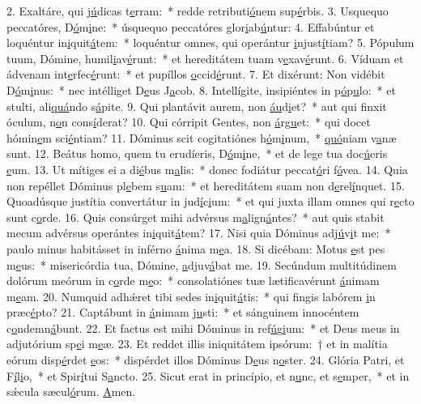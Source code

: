 2. Exaltáre, qui j\uline{ú}dicas t\uline{e}rram:~* redde retributi\uline{ó}nem sup\uline{é}rbis.
3. Usquequo peccatóres, D\uline{ó}m\uline{i}ne:~* úsquequo peccatóres glor\uline{i}ab\uline{ú}ntur:
4. Effabúntur et loquéntur in\uline{i}quit\uline{á}tem:~* loquéntur omnes, qui operántur \uline{i}njust\uline{í}tiam?
5. Pópulum tuum, Dómine, humil\uline{i}av\uline{é}runt:~* et hereditátem tuam v\uline{e}xav\uline{é}runt.
6. Víduam et ádvenam int\uline{e}rfec\uline{é}runt:~* et pupíllos \uline{o}ccid\uline{é}runt.
7. Et dixérunt: Non vidébit D\uline{ó}m\uline{i}nus:~* nec intélliget D\uline{e}us J\uline{a}cob.
8. Intellígite, insipiéntes in p\uline{ó}p\uline{u}lo:~* et stulti, ali\uline{quá}ndo s\uline{á}pite.
9. Qui plantávit aurem, non \uline{áu}d\uline{i}et?~* aut qui finxit óculum, n\uline{o}n cons\uline{í}derat?
10. Qui córripit Gentes, non \uline{á}rg\uline{u}et:~* qui docet hómin\uline{e}m sci\uline{é}ntiam?
11. Dóminus scit cogitatiónes h\uline{ó}m\uline{i}num,~* \uline{quó}niam v\uline{a}næ sunt.
12. Beátus homo, quem tu erudíeris, D\uline{ó}m\uline{i}ne,~* et de lege tua doc\uline{ú}eris \uline{e}um.
13. Ut mítiges ei a di\uline{é}bus m\uline{a}lis:~* donec fodiátur peccat\uline{ó}ri f\uline{ó}vea.
14. Quia non repéllet Dóminus pl\uline{e}bem s\uline{u}am:~* et hereditátem suam non d\uline{e}rel\uline{í}nquet.
15. Quoadúsque justítia convertátur in jud\uline{í}c\uline{i}um:~* et qui juxta illam omnes qui r\uline{e}cto sunt c\uline{o}rde.
16. Quis consúrget mihi advérsus m\uline{a}lign\uline{á}ntes?~* aut quis stabit mecum advérsus operántes in\uline{i}quit\uline{á}tem?
17. Nisi quia Dóminus adj\uline{ú}v\uline{i}t me:~* paulo minus habitásset in inférno \uline{á}nima m\uline{e}a.
18. Si dicébam: Motus \uline{e}st pes m\uline{e}us:~* misericórdia tua, Dómine, \uline{a}djuv\uline{á}bat me.
19. Secúndum multitúdinem dolórum meórum in c\uline{o}rde m\uline{e}o:~* consolatiónes tuæ lætificavérunt \uline{á}nimam m\uline{e}am.
20. Numquid adhǽret tibi sedes in\uline{i}quit\uline{á}tis:~* qui fingis labórem \uline{i}n præc\uline{é}pto?
21. Captábunt in \uline{á}nimam j\uline{u}sti:~* et sánguinem innocéntem c\uline{o}ndemn\uline{á}bunt.
22. Et factus est mihi Dóminus in ref\uline{ú}g\uline{i}um:~* et Deus meus in adjutórium sp\uline{e}i m\uline{e}æ.
23. Et reddet illis iniquitátem ipsórum:~† et in malítia eórum disp\uline{é}rdet \uline{e}os:~* dispérdet illos Dóminus D\uline{e}us n\uline{o}ster.
24. Glória Patri, et F\uline{í}l\uline{i}o,~* et Spir\uline{í}tui S\uline{a}ncto.
25. Sicut erat in princípio, et n\uline{u}nc, et s\uline{e}mper,~* et in sǽcula sæcul\uline{ó}rum. \uline{A}men.
